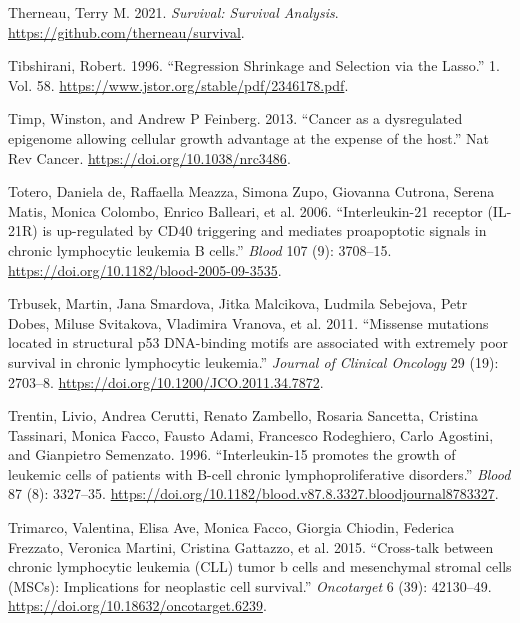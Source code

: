 \documentclass[11pt, a4paper, twosided]{book}
\newenvironment{CSLReferences}%
  {}%
  {\par}
\begin{document}
\begin{CSLReferences}{1}{0}
\leavevmode{}%
Therneau, Terry M. 2021. \emph{Survival: Survival Analysis}. \url{https://github.com/therneau/survival}.

\leavevmode{}%
Tibshirani, Robert. 1996. {``{Regression Shrinkage and Selection via the Lasso}.''} 1. Vol. 58. \url{https://www.jstor.org/stable/pdf/2346178.pdf}.

\leavevmode{}%
Timp, Winston, and Andrew P Feinberg. 2013. {``{Cancer as a dysregulated epigenome allowing cellular growth advantage at the expense of the host}.''} Nat Rev Cancer. \url{https://doi.org/10.1038/nrc3486}.

\leavevmode{}%
Totero, Daniela de, Raffaella Meazza, Simona Zupo, Giovanna Cutrona, Serena Matis, Monica Colombo, Enrico Balleari, et al. 2006. {``{Interleukin-21 receptor (IL-21R) is up-regulated by CD40 triggering and mediates proapoptotic signals in chronic lymphocytic leukemia B cells.}''} \emph{Blood} 107 (9): 3708--15. \url{https://doi.org/10.1182/blood-2005-09-3535}.

\leavevmode{}%
Trbusek, Martin, Jana Smardova, Jitka Malcikova, Ludmila Sebejova, Petr Dobes, Miluse Svitakova, Vladimira Vranova, et al. 2011. {``{Missense mutations located in structural p53 DNA-binding motifs are associated with extremely poor survival in chronic lymphocytic leukemia}.''} \emph{Journal of Clinical Oncology} 29 (19): 2703--8. \url{https://doi.org/10.1200/JCO.2011.34.7872}.

\leavevmode{}%
Trentin, Livio, Andrea Cerutti, Renato Zambello, Rosaria Sancetta, Cristina Tassinari, Monica Facco, Fausto Adami, Francesco Rodeghiero, Carlo Agostini, and Gianpietro Semenzato. 1996. {``{Interleukin-15 promotes the growth of leukemic cells of patients with B-cell chronic lymphoproliferative disorders}.''} \emph{Blood} 87 (8): 3327--35. \url{https://doi.org/10.1182/blood.v87.8.3327.bloodjournal8783327}.

\leavevmode{}%
Trimarco, Valentina, Elisa Ave, Monica Facco, Giorgia Chiodin, Federica Frezzato, Veronica Martini, Cristina Gattazzo, et al. 2015. {``{Cross-talk between chronic lymphocytic leukemia (CLL) tumor b cells and mesenchymal stromal cells (MSCs): Implications for neoplastic cell survival}.''} \emph{Oncotarget} 6 (39): 42130--49. \url{https://doi.org/10.18632/oncotarget.6239}.


\end{CSLReferences}
\end{document}
